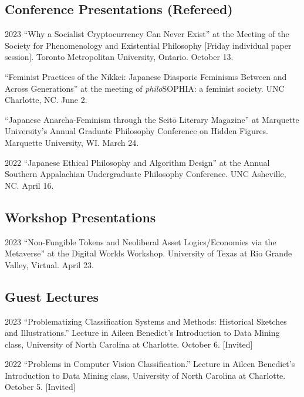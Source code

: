 \documentclass{article}
\begin{document}
\subsection*{\normalsize{Conference Presentations (Refereed)}}
\begin{tablist}
    \item[2023] \tab{}\enquote{Why a Socialist Cryptocurrency Can Never Exist} at the  Meeting of the Society for Phenomenology and Existential Philosophy [Friday individual paper session]. Toronto Metropolitan University, Ontario. October 13.
    \item[] \tab{}\enquote{Feminist Practices of the Nikkei: Japanese Diasporic Feminisms Between and Across Generations} at the  meeting of \textit{philo}SOPHIA: a feminist society. UNC Charlotte, NC. June 2.
    \item[] \tab{}\enquote{Japanese Anarcha-Feminism through the Seitō Literary Magazine} at Marquette University's Annual Graduate Philosophy Conference on Hidden Figures. Marquette University, WI. March 24.
    \item[2022] \tab{}\enquote{Japanese Ethical Philosophy and Algorithm Design} at the  Annual Southern Appalachian Undergraduate Philosophy Conference. UNC Asheville, NC. April 16.
\end{tablist}
\subsection*{\normalsize{Workshop Presentations}}
\begin{tablist}
    \item[2023] \tab{}\enquote{Non-Fungible Tokens and Neoliberal Asset Logics/Economies via the Metaverse} at the Digital Worlds Workshop. University of Texas at Rio Grande Valley, Virtual. April 23.
\end{tablist}
\subsection*{\normalsize{Guest Lectures}}
\begin{tablist}
    \item[2023] \tab{}\enquote{Problematizing Classification Systems and Methods: Historical Sketches and Illustrations.} Lecture in Aileen Benedict's Introduction to Data Mining class, University of North Carolina at Charlotte. October 6. [Invited]
    \item[2022] \tab{}\enquote{Problems in Computer Vision Classification.} Lecture in Aileen Benedict's Introduction to Data Mining class, University of North Carolina at Charlotte. October 5. [Invited]
\end{tablist}
\end{document}
